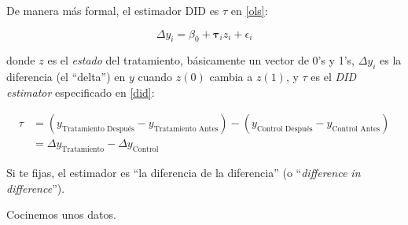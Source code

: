 \documentclass[onesided]{article}\usepackage[]{graphicx}\usepackage[]{color}
\begin{document}
De manera m\'as formal, el estimador DID es $\tau$ en \autoref{ols}:

\begin{equation}\label{ols}
\Delta y_{i} = \beta_{0} + {\mathbf \tau_{i}z_{i}} + \epsilon_{i}
\end{equation}

donde $z$ es el \emph{estado} del tratamiento, b\'asicamente un vector de 0's y 1's, $\Delta y_{i}$ es la diferencia (el ``delta'') en $y$ cuando $z(0)$ cambia a $z(1)$, y $\tau$ es el \emph{DID estimator} especificado en \autoref{did}:



\begin{equation} \label{did}
\begin{split}
\tau & = (y_{\text{Tratamiento Despu\'es}}-y_{\text{Tratamiento Antes}}) - (y_{\text{Control Despu\'es}}-y_{\text{Control Antes}})\\
     & = \Delta y_{\text{Tratamiento}} - \Delta y_{\text{Control}}
\end{split}
\end{equation}


Si te fijas, el estimador es ``la diferencia de la diferencia'' (o ``\emph{difference in difference}'').


Cocinemos unos datos.
\end{document}
